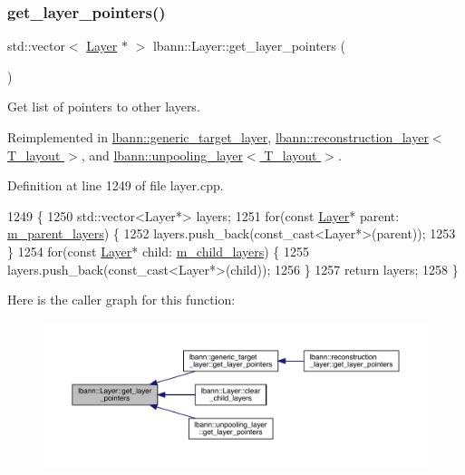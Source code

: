 \subsubsection{\texorpdfstring{get\+\_\+layer\+\_\+pointers()}{get\_layer\_pointers()}}
{\footnotesize\ttfamily std\+::vector$<$ \hyperlink{classlbann_1_1Layer}{Layer} $\ast$ $>$ lbann\+::\+Layer\+::get\+\_\+layer\+\_\+pointers (\begin{DoxyParamCaption}{ }\end{DoxyParamCaption})\hspace{0.3cm}{\ttfamily [virtual]}}

Get list of pointers to other layers. 

Reimplemented in \hyperlink{classlbann_1_1generic__target__layer_a0325a9703238ac0120893214fd0983b5}{lbann\+::generic\+\_\+target\+\_\+layer}, \hyperlink{classlbann_1_1reconstruction__layer_a52f5ebe2f2716b8cab5e768b1b82c3d0}{lbann\+::reconstruction\+\_\+layer$<$ T\+\_\+layout $>$}, and \hyperlink{classlbann_1_1unpooling__layer_a33e17164da27e3370fb3f362dd2e6c13}{lbann\+::unpooling\+\_\+layer$<$ T\+\_\+layout $>$}.



Definition at line 1249 of file layer.\+cpp.


\begin{DoxyCode}
1249                                             \{
1250   std::vector<Layer*> layers;
1251   \textcolor{keywordflow}{for}(\textcolor{keyword}{const} \hyperlink{classlbann_1_1Layer_a24e9c82354a0a2af1b70cbca2211e7d4}{Layer}* parent: \hyperlink{classlbann_1_1Layer_a3fa7c6cf1a22bb14ab0e85e3dc6027c5}{m\_parent\_layers}) \{
1252     layers.push\_back(const\_cast<Layer*>(parent));
1253   \}
1254   \textcolor{keywordflow}{for}(\textcolor{keyword}{const} \hyperlink{classlbann_1_1Layer_a24e9c82354a0a2af1b70cbca2211e7d4}{Layer}* child: \hyperlink{classlbann_1_1Layer_ae348c0d2b4d05f74d809d09debb633c0}{m\_child\_layers}) \{
1255     layers.push\_back(const\_cast<Layer*>(child));
1256   \}
1257   \textcolor{keywordflow}{return} layers;
1258 \}
\end{DoxyCode}
Here is the caller graph for this function\+:\nopagebreak
\begin{figure}[H]
\begin{center}
\leavevmode
\includegraphics[width=350pt]{classlbann_1_1Layer_a9f94210cbb973f1df89ef649899094a1_icgraph}
\end{center}
\end{figure}
\mbox{\label{classlbann_1_1Layer_a4248f27acebf72b7b7b3ee39c8bcb62a}} 
